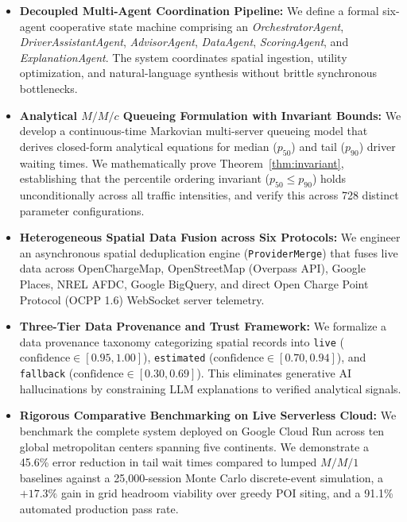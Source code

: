 \documentclass[preprint,12pt,authoryear]{elsarticle}
\begin{document}
\begin{itemize}
    \item \textbf{Decoupled Multi-Agent Coordination Pipeline:} We define a formal six-agent cooperative state machine comprising an \textit{OrchestratorAgent}, \textit{DriverAssistantAgent}, \textit{AdvisorAgent}, \textit{DataAgent}, \textit{ScoringAgent}, and \textit{ExplanationAgent}. The system coordinates spatial ingestion, utility optimization, and natural-language synthesis without brittle synchronous bottlenecks.
    
    \item \textbf{Analytical $M/M/c$ Queueing Formulation with Invariant Bounds:} We develop a continuous-time Markovian multi-server queueing model that derives closed-form analytical equations for median ($p_{50}$) and tail ($p_{90}$) driver waiting times. We mathematically prove Theorem~\ref{thm:invariant}, establishing that the percentile ordering invariant ($p_{50} \le p_{90}$) holds unconditionally across all traffic intensities, and verify this across 728 distinct parameter configurations.
    
    \item \textbf{Heterogeneous Spatial Data Fusion across Six Protocols:} We engineer an asynchronous spatial deduplication engine (\texttt{ProviderMerge}) that fuses live data across OpenChargeMap, OpenStreetMap (Overpass API), Google Places, NREL AFDC, Google BigQuery, and direct Open Charge Point Protocol (OCPP 1.6) WebSocket server telemetry.
    
    \item \textbf{Three-Tier Data Provenance and Trust Framework:} We formalize a data provenance taxonomy categorizing spatial records into \texttt{live} ($\text{confidence} \in [0.95, 1.00]$), \texttt{estimated} ($\text{confidence} \in [0.70, 0.94]$), and \texttt{fallback} ($\text{confidence} \in [0.30, 0.69]$). This eliminates generative AI hallucinations by constraining LLM explanations to verified analytical signals.
    
    \item \textbf{Rigorous Comparative Benchmarking on Live Serverless Cloud:} We benchmark the complete system deployed on Google Cloud Run across ten global metropolitan centers spanning five continents. We demonstrate a 45.6\% error reduction in tail wait times compared to lumped $M/M/1$ baselines against a 25,000-session Monte Carlo discrete-event simulation, a $+17.3\%$ gain in grid headroom viability over greedy POI siting, and a 91.1\% automated production pass rate.
\end{itemize}
\end{document}
